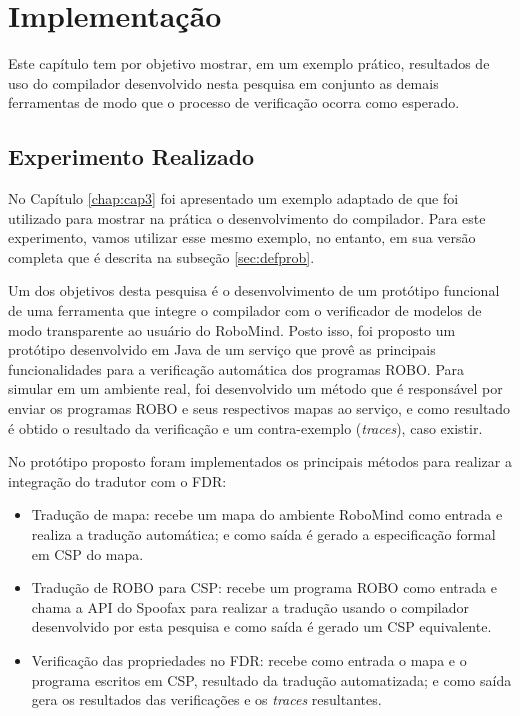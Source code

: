 \chapter{Implementação} %

Este capítulo tem por objetivo mostrar, em um exemplo prático, resultados de uso do compilador desenvolvido nesta pesquisa em conjunto as demais ferramentas de modo que o processo de verificação ocorra como esperado.

\section{Experimento Realizado}
\label{sub:exper}

No Capítulo \ref{chap:cap3} foi apresentado um exemplo adaptado de \cite{furb} que foi utilizado para mostrar na prática o desenvolvimento do compilador. Para este experimento, vamos utilizar esse mesmo exemplo, no entanto, em sua versão completa que é descrita na subseção \ref{sec:defprob}.

Um dos objetivos desta pesquisa é o desenvolvimento de um protótipo funcional de uma ferramenta que integre o compilador com o verificador de modelos de modo transparente ao usuário do RoboMind. Posto isso, foi proposto um protótipo desenvolvido em Java de um serviço que provê as principais funcionalidades para a verificação automática dos programas ROBO. Para simular em um ambiente real, foi desenvolvido um método que é responsável por enviar os programas ROBO e seus respectivos mapas ao serviço, e como resultado é obtido o resultado da verificação e um contra-exemplo (\textit{traces}), caso existir.

No protótipo proposto foram implementados os principais métodos para realizar a integração do tradutor com o FDR:
\begin{itemize}
    \item Tradução de mapa: recebe um mapa do ambiente RoboMind como entrada e realiza a tradução automática; e como saída é gerado a especificação formal em CSP do mapa.
    \item Tradução de ROBO para CSP: recebe um programa ROBO como entrada e chama a API do Spoofax para realizar a tradução usando o compilador desenvolvido por esta pesquisa e como saída é gerado um CSP equivalente.
    \item Verificação das propriedades no FDR: recebe como entrada o mapa e o programa escritos em CSP, resultado da tradução automatizada; e como saída gera os resultados das verificações e os \textit{traces} resultantes.
\end{itemize}

